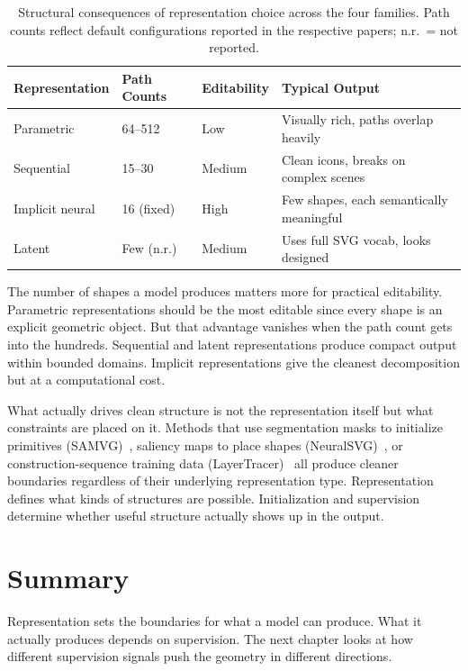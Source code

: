 \begin{table}[htbp]
\centering
\caption{Structural consequences of representation choice across the four families. Path counts reflect default configurations reported in the respective papers; n.r.\ = not reported.}
\label{tab:rep_structure}
\begin{tabular}{l l l p{5.6cm}}
\hline
\textbf{Representation} & \textbf{Path Counts} & \textbf{Editability} & \textbf{Typical Output} \\
\hline
Parametric      & 64--512   & Low    & Visually rich, paths overlap heavily \\
Sequential      & 15--30    & Medium & Clean icons, breaks on complex scenes \\
Implicit neural & 16 (fixed)& High   & Few shapes, each semantically meaningful \\
Latent          & Few (n.r.) & Medium & Uses full SVG vocab, looks designed \\
\hline
\end{tabular}
\end{table}

The number of shapes a model produces matters more for practical editability. 
Parametric representations should be the most editable since every shape is an explicit geometric object. 
But that advantage vanishes when the path count gets into the hundreds. 
Sequential and latent representations produce compact output within bounded domains. 
Implicit representations give the cleanest decomposition but at a computational cost.

What actually drives clean structure is not the representation itself but what constraints are placed on it. 
Methods that use segmentation masks to initialize primitives (SAMVG)~\cite{zhuSAMVGMultistageImage2023}, 
saliency maps to place shapes (NeuralSVG)~\cite{polaczekNeuralSVGImplicitRepresentation2025}, or 
construction-sequence training data (LayerTracer)~\cite{songLayerTracerCognitiveAlignedLayered2025} 
all produce cleaner boundaries regardless of their underlying representation type. 
Representation defines what kinds of structures are possible. 
Initialization and supervision determine whether useful structure actually shows up in the output.

\section{Summary}
\label{sec:rep_summary}

Representation sets the boundaries for what a model can produce. 
What it actually produces depends on supervision. 
The next chapter looks at how different supervision
signals push the geometry in different directions.
